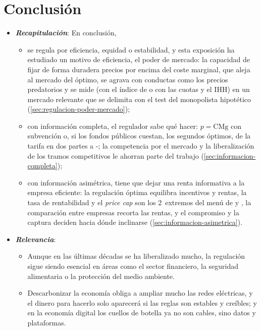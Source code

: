 \documentclass[11pt]{article}
\begin{document}
\section*{Conclusión}

\begin{itemize}
\item \textbf{\emph{Recapitulación}}: En conclusión,
  \begin{itemize}
  \item se regula por eficiencia, equidad o estabilidad, y esta exposición ha estudiado un motivo de eficiencia, el poder de mercado: la capacidad de fijar de forma duradera precios por encima del coste marginal, que aleja al mercado del óptimo, se agrava con conductas como los precios predatorios y se mide (con el índice de  o con las cuotas y el IHH) en un mercado relevante que se delimita con el test del monopolista hipotético (\ref{sec:regulacion-poder-mercado});
  \item con información completa, el regulador sabe qué hacer: $p=\mathrm{CMg}$ con subvención o, si los fondos públicos cuestan, los segundos óptimos, de la tarifa en dos partes a -; la competencia por el mercado y la liberalización de los tramos competitivos le ahorran parte del trabajo (\ref{sec:informacion-completa});
  \item con información asimétrica, tiene que dejar una renta informativa a la empresa eficiente: la regulación óptima equilibra incentivos y rentas, la tasa de rentabilidad y el \emph{price cap} son los 2~extremos del menú de  y , la comparación entre empresas recorta las rentas, y el compromiso y la captura deciden hacia dónde inclinarse (\ref{sec:informacion-asimetrica}).
  \end{itemize}
\item \textbf{\emph{Relevancia}}:
  \begin{itemize}
  \item Aunque en las últimas décadas se ha liberalizado mucho, la regulación sigue siendo esencial en áreas como el sector financiero, la seguridad alimentaria o la protección del medio ambiente.
  \item Descarbonizar la economía obliga a ampliar mucho las redes eléctricas, y el dinero para hacerlo solo aparecerá si las reglas son estables y creíbles; y en la economía digital los cuellos de botella ya no son cables, sino datos y plataformas.

\end{itemize}
\end{itemize}
\end{document}
